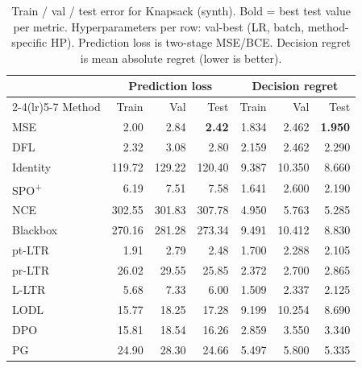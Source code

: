 \begin{table}[h]
\centering
\caption[Train/val/test error for Knapsack (synth).]{Train / val / test error for Knapsack (synth). Bold = best test value per metric. Hyperparameters per row: val-best (LR, batch, method-specific HP). Prediction loss is two-stage MSE/BCE. Decision regret is mean absolute regret (lower is better).}
\label{tab:err-knapsack}
\setlength{\tabcolsep}{4pt}
\renewcommand{\arraystretch}{1.05}
\begin{tabular}{@{}lrrrrrr@{}}
\toprule
& \multicolumn{3}{c}{Prediction loss} & \multicolumn{3}{c}{Decision regret} \\
\cmidrule(lr){2-4}\cmidrule(lr){5-7}
Method & Train & Val & Test & Train & Val & Test \\
\midrule
MSE & 2.00 & 2.84 & \textbf{2.42} & 1.834 & 2.462 & \textbf{1.950} \\
DFL & 2.32 & 3.08 & 2.80 & 2.159 & 2.462 & 2.290 \\
Identity & 119.72 & 129.22 & 120.40 & 9.387 & 10.350 & 8.660 \\
SPO\textsuperscript{+} & 6.19 & 7.51 & 7.58 & 1.641 & 2.600 & 2.190 \\
NCE & 302.55 & 301.83 & 307.78 & 4.950 & 5.763 & 5.285 \\
Blackbox & 270.16 & 281.28 & 273.34 & 9.491 & 10.412 & 8.830 \\
pt-LTR & 1.91 & 2.79 & 2.48 & 1.700 & 2.288 & 2.105 \\
pr-LTR & 26.02 & 29.55 & 25.85 & 2.372 & 2.700 & 2.865 \\
L-LTR & 5.68 & 7.33 & 6.00 & 1.509 & 2.337 & 2.125 \\
LODL & 15.77 & 18.25 & 17.28 & 9.199 & 10.254 & 8.690 \\
DPO & 15.81 & 18.54 & 16.26 & 2.859 & 3.550 & 3.340 \\
PG & 24.90 & 28.30 & 24.66 & 5.497 & 5.800 & 5.335 \\
\bottomrule
\end{tabular}
\end{table}

